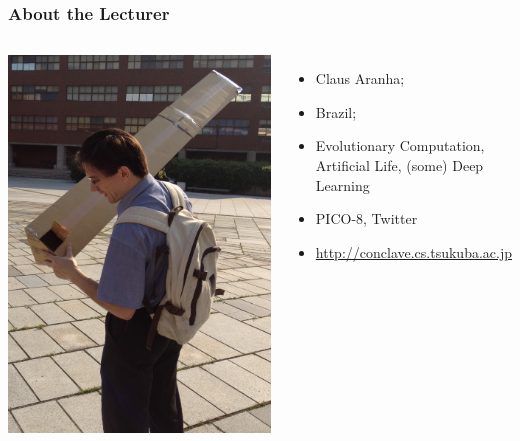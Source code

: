 \documentclass{beamer}
\begin{document}
\begin{frame}
  \frametitle{About the Lecturer}
  \begin{columns}
    \includegraphics[width=1\textwidth]{../img/pinhole}
           {\small
             \begin{itemize}
             \item {} Claus Aranha;
               \medskip
               
             \item {} Brazil;
               \medskip
               
             \item {} Evolutionary Computation,
               Artificial Life, (some) Deep Learning
               \medskip

             \item {} PICO-8, Twitter
               \medskip

             \item {}
               \url{http://conclave.cs.tsukuba.ac.jp}
             \end{itemize}
           }
  \end{columns}
\end{frame}
\end{document}
